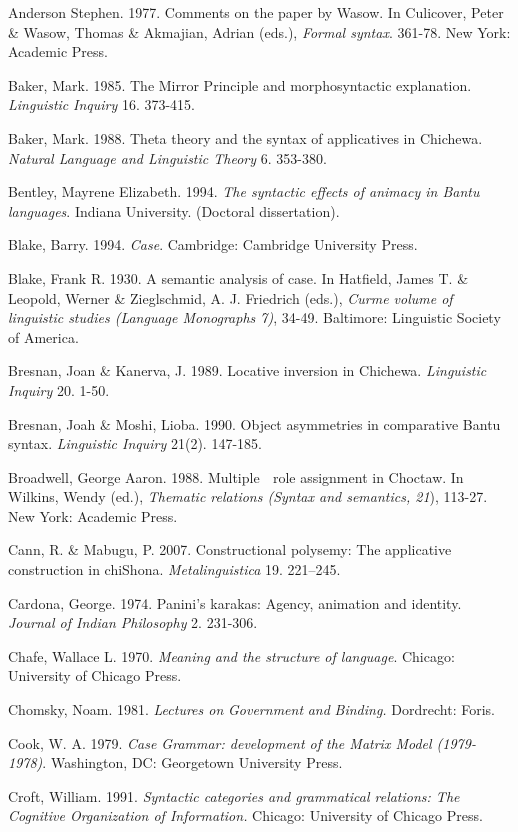 Anderson Stephen. 1977. Comments on the paper by Wasow. In Culicover, Peter \& Wasow, Thomas \& Akmajian, Adrian (eds.),\textit{ Formal syntax}. 361-78. New York: Academic Press.

Baker, Mark. 1985. The Mirror Principle and morphosyntactic explanation. \textit{Linguistic}\textit{ }\textit{Inquiry} 16. 373-415.

Baker, Mark. 1988. Theta theory and the syntax of applicatives in Chichewa. \textit{Natural Language and Linguistic Theory }6. 353-380.

Bentley, Mayrene Elizabeth. 1994. \textit{The syntactic effects of animacy in Bantu languages}. Indiana University. (Doctoral dissertation).

Blake, Barry. 1994. \textit{Case}. Cambridge: Cambridge University Press.

Blake, Frank R. 1930. A semantic analysis of case. In Hatfield, James T. \& Leopold, Werner \& Zieglschmid, A. J. Friedrich (eds.), \textit{Curme volume of linguistic studies (Language Monographs 7)}, 34-49. Baltimore: Linguistic Society of America.

Bresnan, Joan \& Kanerva, J. 1989. Locative inversion in Chichewa. \textit{Linguistic Inquiry }20. 1-50.

Bresnan, Joah \& Moshi, Lioba. 1990. Object asymmetries in comparative Bantu syntax. \textit{Linguistic Inquiry} 21(2). 147-185.

Broadwell, George Aaron. 1988. Multiple  role assignment in Choctaw. In Wilkins, Wendy (ed.),\textit{ Thematic relations (Syntax and semantics, 21}), 113-27. New York: Academic Press.

Cann, R. \& Mabugu, P. 2007. Constructional polysemy: The applicative construction in chiShona. \textit{Metalinguistica }19. 221–245.

Cardona, George. 1974. Panini’s karakas: Agency, animation and identity. \textit{Journal of Indian Philosophy }2. 231-306.

Chafe, Wallace L. 1970. \textit{Meaning and the structure of language}. Chicago: University of Chicago Press.

Chomsky, Noam. 1981. \textit{Lectures on}\textit{ }\textit{Government}\textit{ }\textit{and}\textit{ }\textit{Binding}\textit{. }Dordrecht:\textit{ }Foris.

Cook, W. A. 1979. \textit{Case Grammar: development of the Matrix Model (1979-1978)}. Washington, DC: Georgetown University Press.

Croft, William. 1991.\textit{ }\textit{Syntactic categories and grammatical relations: The Cognitive Organization of Information.} Chicago: University of Chicago Press.

